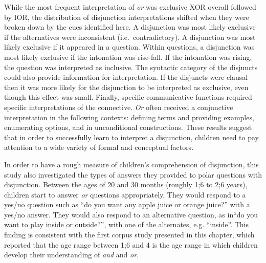 \documentclass[oneside]{report}
\theoremstyle{definition}
\theoremstyle{definition}
\theoremstyle{definition}
\theoremstyle{remark}
\begin{document}
While the most frequent interpretation of \emph{or} was exclusive XOR
overall followed by IOR, the distribution of disjunction interpretations
shifted when they were broken down by the cues identified here. A
disjunction was most likely exclusive if the alternatives were
inconsistent (i.e.~contradictory). A disjunction was most likely
exclusive if it appeared in a question. Within questions, a disjunction
was most likely exclusive if the intonation was rise-fall. If the
intonation was rising, the question was interpreted as inclusive. The
syntactic category of the disjuncts could also provide information for
interpretation. If the disjuncts were clausal then it was more likely
for the disjunction to be interpreted as exclusive, even though this
effect was small. Finally, specific communicative functions required
specific interpretations of the connective. \emph{Or} often received a
conjunctive interpretation in the following contexts: defining terms and
providing examples, enumerating options, and in unconditional
constructions. These results suggest that in order to successfully learn
to interpret a disjunction, children need to pay attention to a wide
variety of formal and conceptual factors.

In order to have a rough measure of children's comprehension of
disjunction, this study also investigated the types of answers they
provided to polar questions with disjunction. Between the ages of 20 and
30 months (roughly 1;6 to 2;6 years), children start to answer \emph{or}
questions appropriately. They would respond to a yes/no question such as
``do you want any apple juice or orange juice?'' with a yes/no answer.
They would also respond to an alternative question, as in``do you want
to play inside or outside?'', with one of the alternates, e.g.
``inside''. This finding is consistent with the first corpus study
presented in this chapter, which reported that the age range between 1;6
and 4 is the age range in which children develop their understanding of
\emph{and} and \emph{or}.
\end{document}
